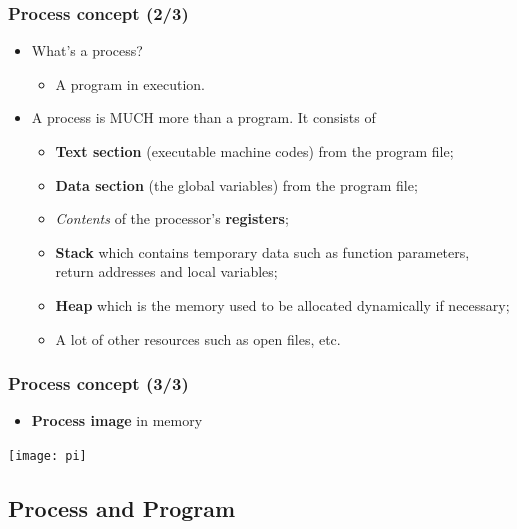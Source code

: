 \documentclass[CJKutf8,xcolor=pdftex,dvipsnames,table]{beamer}
\begin{document}
\begin{CJK*}{UTF8}{song}
  \begin{frame}
  \frametitle{Process concept (2/3)} \pause
  \begin{itemize}
  \item{What's a process?} \pause
    \begin{itemize}
    \item{A program in execution.} \pause
    \end{itemize}
  \item{A process is MUCH more than a program. It consists of} \pause
    \begin{itemize}
    \item{\textbf{Text section} (executable machine codes) from the program file;} \pause
    \item{\textbf{Data section} (the global variables) from the program file;} \pause
    \item{\emph{Contents} of the processor's \textbf{registers};} \pause
    \item{\textbf{Stack} which contains temporary data such as function parameters, return addresses and local variables;} \pause
    \item{\textbf{Heap} which is the memory used to be allocated dynamically if necessary;} \pause
    \item{A lot of other resources such as open files, etc.}
    \end{itemize}
  \end{itemize}
  \end{frame}

  \begin{frame}
  \frametitle{Process concept (3/3)} \pause
  \begin{itemize}
  \item{\textbf{Process image} in memory} \pause
  \end{itemize}
  \begin{center}
    \texttt{[image: pi]}
  \end{center}
  \end{frame}

  \subsection{Process and Program}


\end{CJK*}
\end{document}
